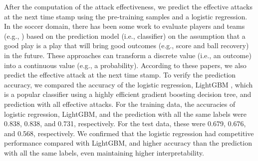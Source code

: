 \documentclass[journal]{IEEEtran}
\begin{document}
After the computation of the attack effectiveness, we predict the effective attacks at the next time stamp using the pre-training samples and a logistic regression.  
In the soccer domain, there has been some work to evaluate players and teams (e.g., \cite{Decroos19,Toda2021}) based on the prediction model (i.e., classifier) on the assumption that a good play is a play that will bring good outcomes (e.g., score and ball recovery) in the future. 
These approaches can transform a discrete value (i.e., an outcome) into a continuous value (e.g., a probability).
According to these papers, we also predict the effective attack at the next time stamp.
To verify the prediction accuracy, we compared the accuracy of the logistic regression, LightGBM \cite{ke2017lightgbm}, which is a popular classifier using a highly efficient gradient boosting decision tree, and prediction with all effective attacks.
For the training data, the accuracies of logistic regression, LightGBM, and the prediction with all the same labels were 0.838, 0.838, and 0.731, respectively.
For the test data, these were 0.679, 0.676, and 0.568, respectively. 
We confirmed that the logistic regression had competitive performance compared with LightGBM, and higher accuracy than the prediction with all the same labels, even maintaining higher interpretability. 
\end{document}

